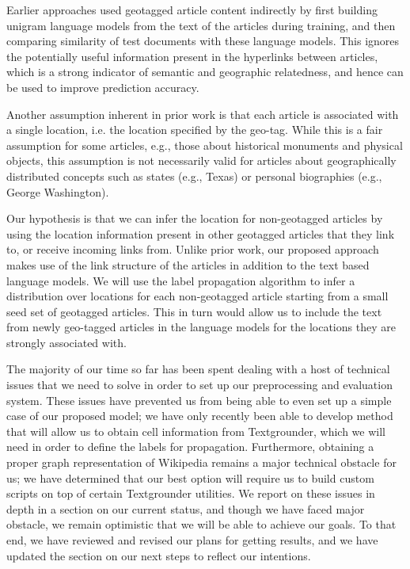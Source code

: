 Earlier approaches used geotagged article content indirectly by first building
unigram language models from the text of the articles during training, and then
comparing similarity of test documents with these language models.
This ignores the potentially useful information present in the  hyperlinks
between articles, which is a strong indicator of semantic and geographic
relatedness, and hence can be used to improve prediction accuracy.

Another assumption inherent in prior work is that each article is associated
with a single location, i.e. the location specified by the geo-tag.
While this is a fair assumption for some articles, e.g., those about historical
monuments and physical objects, this assumption is not necessarily valid for
articles about geographically distributed concepts such as states (e.g., Texas)
or personal biographies (e.g., George Washington). 

Our hypothesis is that we can infer the location for non-geotagged articles by
using the location information present in other geotagged articles that they
link to, or receive incoming links from.
Unlike prior work, our proposed approach makes use of the link structure of the
articles in addition to the text based language models.
We will use the label propagation algorithm to infer a distribution over
locations for each non-geotagged article starting from a small seed set of
geotagged articles.
This in turn would allow us to include the text from newly geo-tagged articles
in the language models for the locations they are strongly associated with.

The majority of our time so far has been spent dealing with a host of
technical issues that we need to solve in order to set up our preprocessing and
evaluation system.
These issues have prevented us from being able to even set up a simple case of
our proposed model; we have only recently been able to develop method that will
allow us to obtain cell information from Textgrounder, which we will need in
order to define the labels for propagation.
Furthermore, obtaining a proper graph representation of Wikipedia remains a
major technical obstacle for us; we have determined that our best option will
require us to build custom scripts on top of certain Textgrounder utilities.
We report on these issues in depth in a section on our current status, and
though we have faced major obstacle, we remain optimistic that we will be able
to achieve our goals.
To that end, we have reviewed and revised our plans for getting results, and we
have updated the section on our next steps to reflect our intentions.


